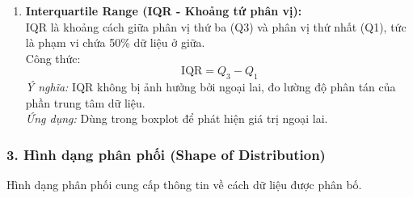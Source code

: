 \documentclass[a4paper,12pt]{article}
\begin{document}
\begin{enumerate}[label=\Roman*.]
    \item \textbf{Interquartile Range (IQR - Khoảng tứ phân vị):} \\
    IQR là khoảng cách giữa phân vị thứ ba (Q3) và phân vị thứ nhất (Q1), tức là phạm vi chứa 50\% dữ liệu ở giữa. \\
    Công thức:
    \[
    \text{IQR} = Q_3 - Q_1
    \]
    \textit{Ý nghĩa:} IQR không bị ảnh hưởng bởi ngoại lai, đo lường độ phân tán của phần trung tâm dữ liệu. \\
    \textit{Ứng dụng:} Dùng trong boxplot để phát hiện giá trị ngoại lai.
\end{enumerate}

\subsubsection*{3. Hình dạng phân phối (Shape of Distribution)}
Hình dạng phân phối cung cấp thông tin về cách dữ liệu được phân bố.
\end{document}
